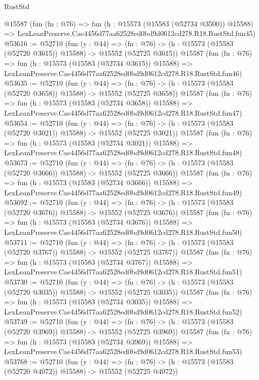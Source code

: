 \begin{lexlean}{RustStd}
\begin{coremodule}
    @15587
    (fun (fn : @76) =>
    fun (h : @15573 (@15583 (@52734 @3500)) @15588) =>
    LexLeanPreserve.Cae4456d77aa62528ed0bd9d0612cd278.R18.RustStd.fun45)
@53616 := @52710
    (fun (y : @44) =>
    (fn : @76) -> (h : @15573 (@15583 (@52720 @3615)) @15588) -> @15552 (@52725 @3615))
    @15587
    (fun (fn : @76) =>
    fun (h : @15573 (@15583 (@52734 @3615)) @15588) =>
    LexLeanPreserve.Cae4456d77aa62528ed0bd9d0612cd278.R18.RustStd.fun46)
@53635 := @52710
    (fun (y : @44) =>
    (fn : @76) -> (h : @15573 (@15583 (@52720 @3658)) @15588) -> @15552 (@52725 @3658))
    @15587
    (fun (fn : @76) =>
    fun (h : @15573 (@15583 (@52734 @3658)) @15588) =>
    LexLeanPreserve.Cae4456d77aa62528ed0bd9d0612cd278.R18.RustStd.fun47)
@53654 := @52710
    (fun (y : @44) =>
    (fn : @76) -> (h : @15573 (@15583 (@52720 @3021)) @15588) -> @15552 (@52725 @3021))
    @15587
    (fun (fn : @76) =>
    fun (h : @15573 (@15583 (@52734 @3021)) @15588) =>
    LexLeanPreserve.Cae4456d77aa62528ed0bd9d0612cd278.R18.RustStd.fun48)
@53673 := @52710
    (fun (y : @44) =>
    (fn : @76) -> (h : @15573 (@15583 (@52720 @3666)) @15588) -> @15552 (@52725 @3666))
    @15587
    (fun (fn : @76) =>
    fun (h : @15573 (@15583 (@52734 @3666)) @15588) =>
    LexLeanPreserve.Cae4456d77aa62528ed0bd9d0612cd278.R18.RustStd.fun49)
@53692 := @52710
    (fun (y : @44) =>
    (fn : @76) -> (h : @15573 (@15583 (@52720 @3676)) @15588) -> @15552 (@52725 @3676))
    @15587
    (fun (fn : @76) =>
    fun (h : @15573 (@15583 (@52734 @3676)) @15588) =>
    LexLeanPreserve.Cae4456d77aa62528ed0bd9d0612cd278.R18.RustStd.fun50)
@53711 := @52710
    (fun (y : @44) =>
    (fn : @76) -> (h : @15573 (@15583 (@52720 @3767)) @15588) -> @15552 (@52725 @3767))
    @15587
    (fun (fn : @76) =>
    fun (h : @15573 (@15583 (@52734 @3767)) @15588) =>
    LexLeanPreserve.Cae4456d77aa62528ed0bd9d0612cd278.R18.RustStd.fun51)
@53730 := @52710
    (fun (y : @44) =>
    (fn : @76) -> (h : @15573 (@15583 (@52720 @3035)) @15588) -> @15552 (@52725 @3035))
    @15587
    (fun (fn : @76) =>
    fun (h : @15573 (@15583 (@52734 @3035)) @15588) =>
    LexLeanPreserve.Cae4456d77aa62528ed0bd9d0612cd278.R18.RustStd.fun52)
@53749 := @52710
    (fun (y : @44) =>
    (fn : @76) -> (h : @15573 (@15583 (@52720 @3969)) @15588) -> @15552 (@52725 @3969))
    @15587
    (fun (fn : @76) =>
    fun (h : @15573 (@15583 (@52734 @3969)) @15588) =>
    LexLeanPreserve.Cae4456d77aa62528ed0bd9d0612cd278.R18.RustStd.fun53)
@53768 := @52710
    (fun (y : @44) =>
    (fn : @76) -> (h : @15573 (@15583 (@52720 @4072)) @15588) -> @15552 (@52725 @4072))

\end{coremodule}
\end{lexlean}
